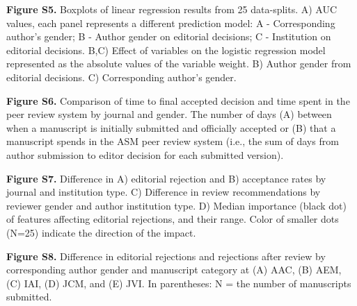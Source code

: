 \documentclass[11pt,]{article}
\begin{document}
\textbf{Figure S5.} Boxplots of linear regression results from 25
data-splits. A) AUC values, each panel represents a different prediction
model: A - Corresponding author's gender; B - Author gender on editorial
decisions; C - Institution on editorial decisions. B,C) Effect of
variables on the logistic regression model represented as the absolute
values of the variable weight. B) Author gender from editorial
decisions. C) Corresponding author's gender.

\textbf{Figure S6.} Comparison of time to final accepted decision and
time spent in the peer review system by journal and gender. The number
of days (A) between when a manuscript is initially submitted and
officially accepted or (B) that a manuscript spends in the ASM peer
review system (i.e., the sum of days from author submission to editor
decision for each submitted version).

\textbf{Figure S7.} Difference in A) editorial rejection and B)
acceptance rates by journal and institution type. C) Difference in
review recommendations by reviewer gender and author institution type.
D) Median importance (black dot) of features affecting editorial
rejections, and their range. Color of smaller dots (N=25) indicate the
direction of the impact.

\textbf{Figure S8.} Difference in editorial rejections and rejections
after review by corresponding author gender and manuscript category at
(A) AAC, (B) AEM, (C) IAI, (D) JCM, and (E) JVI. In parentheses: N = the
number of manuscripts submitted.
\end{document}
